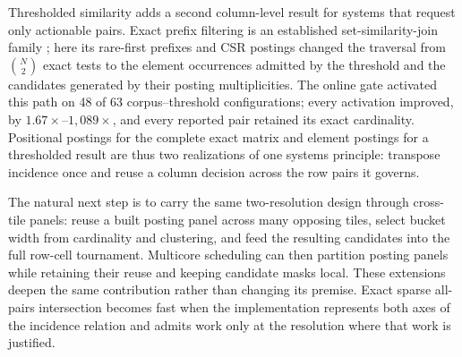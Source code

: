 Thresholded similarity adds a second column-level result for systems that request only actionable
pairs. Exact prefix filtering is an established set-similarity-join family
\cite{arasu2006exact,bayardo2007allpairs,xiao2011ppjoin,mann2016empirical}; here its rare-first
prefixes and CSR postings changed the traversal from $\binom{N}{2}$ exact tests to
the element occurrences admitted by the threshold and the candidates generated by their posting
multiplicities. The online gate activated this path on 48 of 63 corpus--threshold configurations;
every activation improved, by $1.67\times$--$1{,}089\times$, and every reported pair retained its
exact cardinality. Positional postings for the complete exact matrix and element postings for a
thresholded result are thus two realizations of one systems principle: transpose incidence once and
reuse a column decision across the row pairs it governs.

The natural next step is to carry the same two-resolution design through cross-tile panels: reuse a
built posting panel across many opposing tiles, select bucket width from cardinality and clustering,
and feed the resulting candidates into the full row-cell tournament. Multicore scheduling can then
partition posting panels while retaining their reuse and keeping candidate masks local. These
extensions deepen the same contribution rather than changing its premise. Exact sparse all-pairs
intersection becomes fast when the implementation represents both axes of the incidence relation and
admits work only at the resolution where that work is justified.
